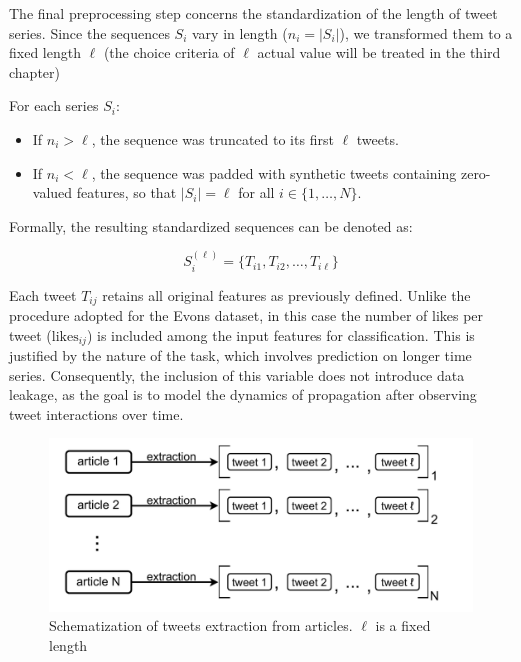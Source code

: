 \documentclass[a4paper,twoside,12pt]{book}
\begin{document}
The final preprocessing step concerns the standardization of the length of tweet series. Since the sequences $S_i$ vary in length ($n_i = |S_i|$), we transformed them to a fixed length $\ell$ (the choice criteria of $\ell$ actual value will be treated in the third chapter)

For each series $S_i$:

\begin{itemize}
	\item If $n_i > \ell$, the sequence was truncated to its first $\ell$ tweets.
	\item If $n_i < \ell$, the sequence was padded with synthetic tweets containing zero-valued features, so that $|S_i| = \ell$ for all $i \in \{1, \dots, N\}$.
\end{itemize}

Formally, the resulting standardized sequences can be denoted as:

$$
S_i^{(\ell)} = \{ T_{i1}, T_{i2}, \dots, T_{i\ell} \}
$$

Each tweet $T_{ij}$ retains all original features as previously defined. Unlike the procedure adopted for the Evons dataset, in this case the number of likes per tweet ($\text{likes}_{ij}$) is included among the input features for classification. This is justified by the nature of the task, which involves prediction on longer time series. Consequently, the inclusion of this variable does not introduce data leakage, as the goal is to model the dynamics of propagation after observing tweet interactions over time.

\vspace{2em}

\begin{figure}[h!]
	\centering
	\includegraphics[width=\textwidth]{./img/article_tweet_diagram-2.pdf}
	\caption{Schematization of tweets extraction from articles. $\ell$ is a fixed length}
	\label{fig:articles_to_series}
\end{figure}
\end{document}

